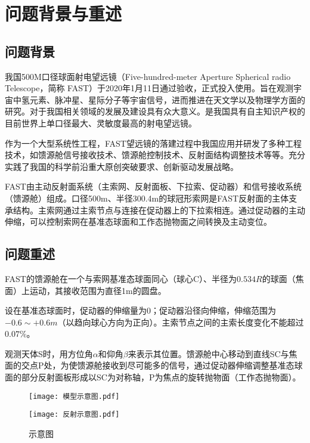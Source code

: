 \documentclass[withoutpreface,bwprint,fontset=macnew]{cumcmthesis} %
\begin{document}
	
	\section{问题背景与重述}
	\subsection{问题背景}
	我国500M口径球面射电望远镜（Five-hundred-meter Aperture Spherical radio Telescope，简称 FAST）于2020年1月11日通过验收，正式投入使用。旨在观测宇宙中氢元素、脉冲星、星际分子等宇宙信号，进而推进在天文学以及物理学方面的研究。对于我国相关领域的发展及建设具有众大意义。是我国具有自主知识产权的目前世界上单口径最大、灵敏度最高的射电望远镜。

	作为一个大型系统性工程，FAST望远镜的落建过程中我国应用并研发了多种工程技术，如馈源舱信号接收技术、馈源舱控制技术、反射面结构调整技术等等。充分实践了我国的科学前沿重大原创突破要求、创新驱动发展战略。

	FAST由主动反射面系统（主索网、反射面板、下拉索、促动器）和信号接收系统（馈源舱）组成。口径500m、半径300.4m的球冠形索网是FAST反射面的主体支承结构。主索网通过主索节点与连接在促动器上的下拉索相连。通过促动器的主动伸缩，可以控制索网在基准态球面和工作态抛物面之间转换及主动变位。

	\subsection{问题重述}

	FAST的馈源舱在一个与索网基准态球面同心（球心C）、半径为$0.534R$的球面（焦面）上运动，其接收范围为直径1m的圆盘。

	设在基准态球面时，促动器的伸缩量为$0$；促动器沿径向伸缩，伸缩范围为$-0.6 \sim +0.6m$（以趋向球心方向为正向）。主索节点之间的主索长度变化不能超过$0.07\%$。

	观测天体S时，用方位角$\alpha$和仰角$\beta$来表示其位置。馈源舱中心移动到直线SC与焦面的交点P处，为使馈源舱接收到尽可能多的信号，通过促动器伸缩调整基准态球面的部分反射面板形成以SC为对称轴，P为焦点的旋转抛物面（工作态抛物面）。
	
	\begin{figure}[!h]
		\centering
		\begin{minipage}[c]{0.48\textwidth}
			\centering
			\texttt{[image: 模型示意图.pdf]}
			\label{fig:sample-figure-a}
		\end{minipage}
		\begin{minipage}[c]{0.48\textwidth}
			\centering
			\texttt{[image: 反射示意图.pdf]}
			\label{fig:sample-figure-b}
		\end{minipage}
		\caption{示意图}
		\label{fig:sample-figure}
	\end{figure}
\end{document}
